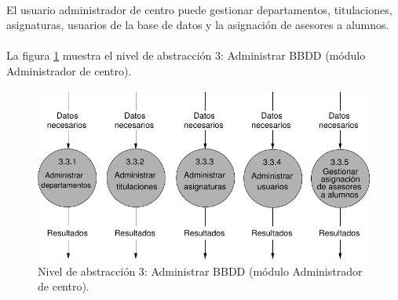 \paragraph{}El usuario administrador de centro puede gestionar departamentos,
titulaciones, asignaturas, usuarios de la base de datos y la asignación de
asesores a alumnos.

\paragraph{}La figura \ref{diagramaNivel3-AdministrarBBDD-adminCentro} muestra
el nivel de abstracción 3: Administrar BBDD (módulo Administrador de centro).

  \begin{figure}[!ht]
    \begin{center}
      \includegraphics[]{08.Analisis_Funcional/8.2.DFDs/Niveles/Nivel3/AdministradorCentro/AdministrarBBDD/Diagramas/nivel3-AdministrarBBDD.pdf}
      \caption{Nivel de abstracción 3: Administrar BBDD (módulo Administrador
      de centro).}
      \label{diagramaNivel3-AdministrarBBDD-adminCentro}
    \end{center}
  \end{figure}
